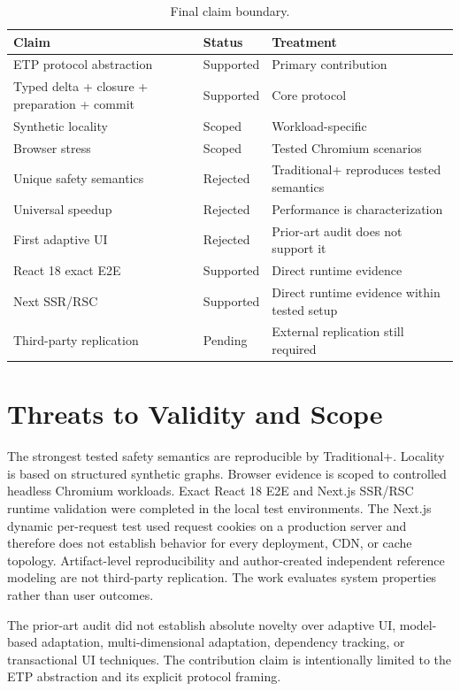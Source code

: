 \documentclass[manuscript]{acmart}
\begin{document}
\begin{table}[t]
\centering
\caption{Final claim boundary.}
\label{tab:claim-boundary}
\small
\begin{tabular}{p{}p{}p{}}
\toprule
Claim & Status & Treatment\\
\midrule
ETP protocol abstraction & Supported & Primary contribution\\
Typed delta + closure + preparation + commit & Supported & Core protocol\\
Synthetic locality & Scoped & Workload-specific\\
Browser stress & Scoped & Tested Chromium scenarios\\
Unique safety semantics & Rejected & Traditional+ reproduces tested semantics\\
Universal speedup & Rejected & Performance is characterization\\
First adaptive UI & Rejected & Prior-art audit does not support it\\
React 18 exact E2E & Supported & Direct runtime evidence\\
Next SSR/RSC & Supported & Direct runtime evidence within tested setup\\
Third-party replication & Pending & External replication still required\\
\bottomrule
\end{tabular}
\end{table}

\section{Threats to Validity and Scope}
The strongest tested safety semantics are reproducible by Traditional+. Locality is based on
structured synthetic graphs. Browser evidence is scoped to controlled headless Chromium
workloads. Exact React 18 E2E and Next.js SSR/RSC runtime validation were completed in the local test environments. The Next.js dynamic per-request test used request cookies on a production server and therefore does not establish behavior for every deployment, CDN, or cache topology.
Artifact-level reproducibility and author-created independent reference modeling are not
third-party replication. The work evaluates system properties rather than user outcomes.

The prior-art audit did not establish absolute novelty over adaptive UI, model-based
adaptation, multi-dimensional adaptation, dependency tracking, or transactional UI
techniques. The contribution claim is intentionally limited to the ETP abstraction and its
explicit protocol framing.
\end{document}

